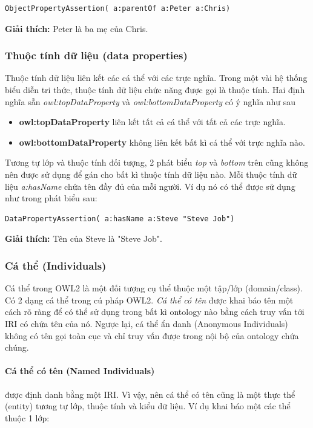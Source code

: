 \begin{verbatim}
ObjectPropertyAssertion( a:parentOf a:Peter a:Chris)  
\end{verbatim}

\textbf{Giải thích:} Peter là ba mẹ của Chris.

\subsubsection{Thuộc tính dữ liệu (data properties)}
Thuộc tính dữ liệu liên kết các cá thể với các trực nghĩa. Trong một vài hệ thống biểu diễn tri thức, thuộc tính dữ liệu chức năng được gọi là thuộc tính.
Hai định nghĩa sẵn \textit{owl:topDataProperty} và \textit{owl:bottomDataProperty} có ý nghĩa như sau
\begin{itemize}
\item \textbf{owl:topDataProperty} liên kết tất cả cá thể với tất cả các trực nghĩa.
\item \textbf{owl:bottomDataProperty} không liên kết bất kì cá thể với trực nghĩa nào.
\end{itemize}
Tương tự lớp và thuộc tính đối tượng, 2 phát biểu \textit{top} và \textit{bottom} trên cũng không nên được sử dụng để gán cho bất kì thuộc tính dữ liệu nào. Mỗi thuộc tính dữ liệu \textit{a:hasName} chứa tên đầy đủ của mỗi người. Ví dụ nó có thể được sử dụng như trong phát biểu sau:

\begin{verbatim}
DataPropertyAssertion( a:hasName a:Steve "Steve Job") 
\end{verbatim}

\textbf{Giải thích:} Tên của Steve là "Steve Job".

\subsubsection{Cá thể (Individuals)}
Cá thể trong OWL2 là một đối tượng cụ thể thuộc một tập/lớp (domain/class). Có 2 dạng cá thể trong cú pháp OWL2. \textit{Cá thể có tên} được khai báo tên một cách rõ ràng để có thể sử dụng trong bất kì ontology nào bằng cách truy vấn tới IRI có chứa tên của nó. Ngược lại, cá thể ẩn danh (Anonymous Individuals) không có tên gọi toàn cục và chỉ truy vấn được trong nội bộ của ontology chứa chúng.

\paragraph{Cá thể có tên (Named Individuals)} được định danh bằng một IRI. Vì vậy, nên cá thể có tên cũng là một thực thể (entity) tương tự lớp, thuộc tính và kiểu dữ liệu. Ví dụ khai báo một các thể thuộc 1 lớp:

